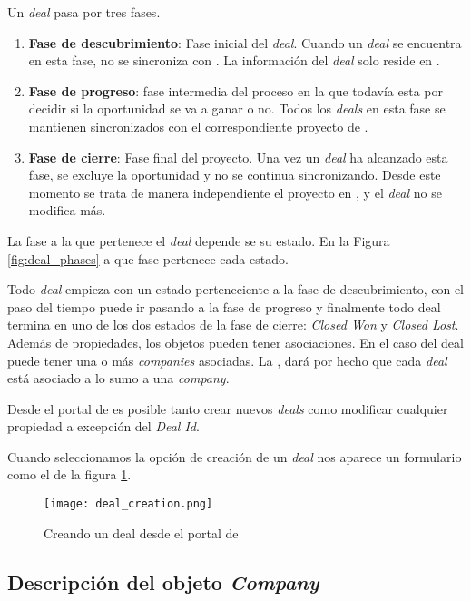 		
		Un \textit{deal} pasa por tres fases.
		
		\begin{enumerate}
			\item \textbf{Fase de descubrimiento}: Fase inicial del \textit{deal}. Cuando un \textit{deal} se encuentra en esta fase, no se sincroniza con \wday. La información del \textit{deal} solo reside en \hs.
			\item \textbf{Fase de progreso}: fase intermedia del proceso en la que todavía esta por decidir si la oportunidad se va a ganar o no. Todos los \textit{deals} en esta fase se mantienen sincronizados con el correspondiente proyecto de \wday.
			\item \textbf{Fase de cierre}: Fase final del proyecto. Una vez un \textit{deal} ha alcanzado esta fase, se excluye la oportunidad y no se continua sincronizando. Desde este momento se trata de manera independiente el proyecto en \wday{}, y el \textit{deal} no se modifica más. 
		\end{enumerate}
	
		La fase a la que pertenece el \textit{deal} depende se su estado. En la Figura \ref{fig:deal_phases} a que fase pertenece cada estado.
		
		
		Todo \textit{deal} empieza con un estado perteneciente a la fase de descubrimiento, con el paso del tiempo puede ir pasando a la fase de progreso y finalmente todo deal termina en uno de los dos estados de la fase de cierre: \textit{Closed Won} y \textit{Closed Lost}.\\
			
			
		Además de propiedades, los objetos pueden tener asociaciones. En el caso del deal puede tener una o más \textit{companies} asociadas. La \iface{}, dará por hecho que cada \textit{deal} está asociado a lo sumo a una \textit{company}.
			
		Desde el portal de \hs{} es posible tanto crear nuevos \textit{deals} como modificar cualquier propiedad a excepción del \textit{Deal Id}.
		
		Cuando seleccionamos la opción de creación de un \textit{deal} nos aparece un formulario como el de la figura \ref{fig:create_deal}.
		
		\begin{figure}
			\centering
			\texttt{[image: deal\_creation.png]}
			\caption{Creando un deal desde el portal de \hs{}}
			\label{fig:create_deal}
		\end{figure}

\subsection{Descripción del objeto \textit{Company}}
		
